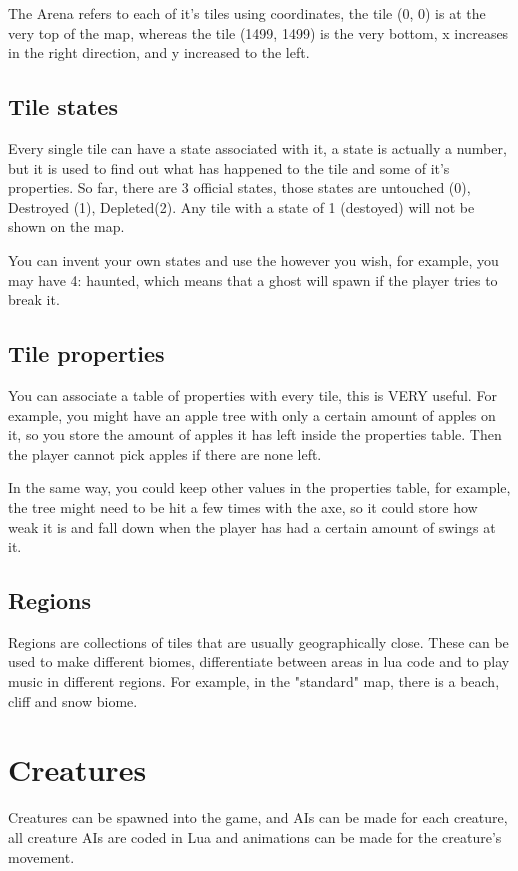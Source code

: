 \documentclass{book}
\begin{document}
	The Arena refers to each of it's tiles using coordinates, the tile (0, 0) is at the very top of the map, whereas the tile (1499, 1499) is the very bottom, x increases in the right direction, and y increased to the left.

	\subsection{Tile states}
	Every single tile can have a state associated with it, a state is actually a number, but it is used to find out what has happened to the tile and some of it's properties. So far, there are 3 official states, those states are untouched (0), Destroyed (1), Depleted(2). Any tile with a state of 1 (destoyed) will not be shown on the map.
	
	You can invent your own states and use the however you wish, for example, you may have 4: haunted, which means that a ghost will spawn if the player tries to break it.

	\subsection{Tile properties}
	You can associate a table of properties with every tile, this is VERY useful. For example, you might have an apple tree with only a certain amount of apples on it, so you store the amount of apples it has left inside the properties table. Then the player cannot pick apples if there are none left. 
	
	In the same way, you could keep other values in the properties table, for example, the tree might need to be hit a few times with the axe, so it could store how weak it is and fall down when the player has had a certain amount of swings at it.
	
	\subsection{Regions}
	Regions are collections of tiles that are usually geographically close. These can be used to make different biomes, differentiate between areas in lua code and to play music in different regions. For example, in the "standard" map, there is a beach, cliff and snow biome. 
	
	\section{Creatures}
	Creatures can be spawned into the game, and AIs can be made for each creature, all creature AIs are coded in Lua and animations can be made for the creature's movement.
	
\end{document}

